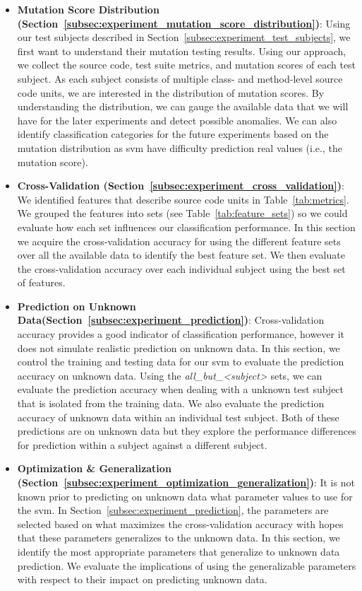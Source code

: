 \begin{itemize}
  \item \textbf{Mutation Score Distribution (Section~\ref{subsec:experiment_mutation_score_distribution})}: Using our test subjects described in Section~\ref{subsec:experiment_test_subjects}, we first want to understand their mutation testing results. Using our approach, we collect the source code, test suite metrics, and mutation scores of each test subject. As each subject consists of multiple class- and method-level source code units, we are interested in the distribution of mutation scores. By understanding the distribution, we can gauge the available data that we will have for the later experiments and detect possible anomalies. We can also identify classification categories for the future experiments based on the mutation distribution as \gls{svm} have difficulty prediction real values (i.e., the mutation score).
  \item \textbf{Cross-Validation (Section~\ref{subsec:experiment_cross_validation})}: We identified features that describe source code units in Table~\ref{tab:metrics}. We grouped the features into sets (see Table~\ref{tab:feature_sets}) so we could evaluate how each set influences our classification performance. In this section we acquire the cross-validation accuracy for using the different feature sets over all the available data to identify the best feature set. We then evaluate the cross-validation accuracy over each individual subject using the best set of features.
  \item \textbf{Prediction on Unknown Data(Section~\ref{subsec:experiment_prediction})}: Cross-validation accuracy provides a good indicator of classification performance, however it does not simulate realistic prediction on unknown data. In this section, we  control the training and testing data for our \gls{svm} to evaluate the prediction accuracy on unknown data. Using the \emph{all\_but\_<subject>} sets, we can evaluate the prediction accuracy when dealing with a unknown test subject that is isolated from the training data. We also evaluate the prediction accuracy of unknown data within an individual test subject. Both of these predictions are on unknown data but they explore the performance differences for prediction within a subject against a different subject.
  \item \textbf{Optimization \& Generalization (Section~\ref{subsec:experiment_optimization_generalization})}: It is not known prior to predicting on unknown data what parameter values to use for the \gls{svm}. In Section~\ref{subsec:experiment_prediction}, the parameters are selected based on what maximizes the cross-validation accuracy with hopes that these parameters generalizes to the unknown data. In this section, we identify the most appropriate parameters that generalize to unknown data prediction. We evaluate the implications of using the generalizable parameters with respect to their impact on predicting unknown data.

\end{itemize}
